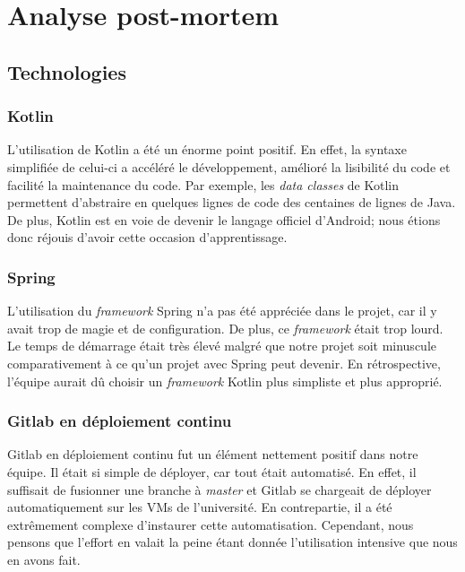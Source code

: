 \section{Analyse post-mortem}
    \subsection{Technologies}
        \subsubsection{Kotlin}
        L'utilisation de Kotlin a été un énorme point positif. En effet, la syntaxe simplifiée de celui-ci a accéléré le développement, amélioré la lisibilité du code et facilité la maintenance du code. Par exemple, les \emph{data classes} de Kotlin permettent d'abstraire en quelques lignes de code des centaines de lignes de Java. De plus, Kotlin est en voie de devenir le langage officiel d'Android; nous étions donc réjouis d'avoir cette occasion d'apprentissage.
        
        \subsubsection{Spring}
        L'utilisation du \emph{framework} Spring n'a pas été appréciée dans le projet, car il y avait trop de magie et de configuration. De plus, ce \emph{framework} était trop lourd. Le temps de démarrage était très élevé malgré que notre projet soit minuscule comparativement à ce qu'un projet avec Spring peut devenir. En rétrospective, l'équipe aurait dû choisir un \emph{framework} Kotlin plus simpliste et plus approprié.

        \subsubsection{Gitlab en déploiement continu}
        Gitlab en déploiement continu fut un élément nettement positif dans notre équipe. Il était si simple de déployer, car tout était automatisé. En effet, il suffisait de fusionner une branche à \emph{master} et Gitlab se chargeait de déployer automatiquement sur les VMs de l'université. En contrepartie, il a été extrêmement complexe d'instaurer cette automatisation. Cependant, nous pensons que l'effort en valait la peine étant donnée l'utilisation intensive que nous en avons fait.
        
